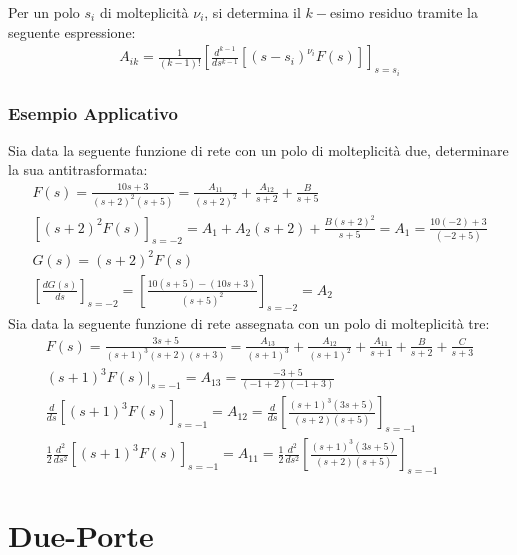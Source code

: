 \documentclass{article}
\numberwithin{equation}{subsection}
\begin{document}
Per un polo $s_i$ di molteplicità $\nu_i$, si determina il $k-$esimo residuo tramite la seguente espressione:
\begin{gather*}
    A_{ik}=\displaystyle\frac{1}{(k-1)!}\left[\frac{d^{k-1}}{ds^{k-1}}\left[(s-s_i)^{\nu_i}F(s)\right]\right]_{s=s_i}
\end{gather*}

\subsubsection{Esempio Applicativo}

Sia data la seguente funzione di rete con un polo di molteplicità due, determinare la sua antitrasformata: 
\begin{gather*}
    F(s)=\displaystyle\frac{10s+3}{(s+2)^2(s+5)}=\frac{A_{11}}{(s+2)^2}+\frac{A_{12}}{s+2}+\frac{B}{s+5}\\
    \left[(s+2)^2F(s)\right]_{s=-2}=A_1+A_2(s+2)+\displaystyle\frac{B(s+2)^2}{s+5}=A_1=\frac{10(-2)+3}{(-2+5)}\\
    G(s)=(s+2)^2F(s)\\
    \displaystyle\left[\frac{dG(s)}{ds}\right]_{s=-2}=\left[\frac{10(s+5)-(10s+3)}{(s+5)^2}\right]_{s=-2}=A_2
\end{gather*}
Sia data la seguente funzione di rete assegnata con un polo di molteplicità tre:
\begin{gather*}
    F(s)=\displaystyle\frac{3s+5}{(s+1)^3(s+2)(s+3)}=\frac{A_{13}}{(s+1)^3}+\frac{A_{12}}{(s+1)^2}+\frac{A_{11}}{s+1}+\frac{B}{s+2}+\frac{C}{s+3}\\
    (s+1)^3F(s)\bigg|_{s=-1}=A_{13}=\displaystyle\frac{-3+5}{(-1+2)(-1+3)}\\
    \displaystyle\frac{d}{ds}\left[(s+1)^3F(s)\right]_{s=-1}=A_{12}=\frac{d}{ds}\left[\frac{(s+1)^3(3s+5)}{(s+2)(s+5)}\right]_{s=-1}\\
    \frac{1}{2}\displaystyle\frac{d^2}{ds^2}\left[(s+1)^3F(s)\right]_{s=-1}=A_{11}=\frac{1}{2}\frac{d^2}{ds^2}\left[\frac{(s+1)^3(3s+5)}{(s+2)(s+5)}\right]_{s=-1}
\end{gather*}

\clearpage

\section{Due-Porte}
\end{document}
